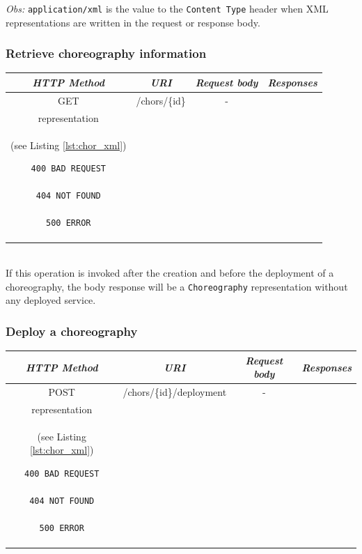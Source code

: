 \emph{Obs:} \texttt{application/xml} is the value to the \texttt{Content Type} header when XML representations are written in the request or response body. 

\subsubsection*{Retrieve choreography information}

\begin{tabular}{|c|c|c|c|}
\hline 
\itshape{HTTP Method} & \itshape{URI} & \itshape{Request body} & \itshape{Responses} \\ 
\hline 
GET & /chors/\{id\} & - &
\begin{minipage}{2in}
\begin{verbatim}

200 OK
location = "/chors/{id}"

Body: 
\end{verbatim}
\verb!Choreography! XML \\
representation \\
(see Listing \ref{lst:chor_xml})
\begin{verbatim}
400 BAD REQUEST

404 NOT FOUND

500 ERROR

\end{verbatim}
\end{minipage} 
\\ 
\hline 
\end{tabular} \\

If this operation is invoked after the creation and before the deployment of a choreography, the body response will be a \verb!Choreography! representation without any deployed service.

\subsubsection*{Deploy a choreography}

\begin{tabular}{|c|c|c|c|}
\hline 
\itshape{HTTP Method} & \itshape{URI} & \itshape{Request body} & \itshape{Responses} \\ 
\hline 
POST & /chors/\{id\}/deployment & - &
\begin{minipage}{2in}
\begin{verbatim}

200 OK
location = "/chors/{id}"
Body: 
\end{verbatim}
\verb!Choreography! XML \\
representation \\
(see Listing \ref{lst:chor_xml})
\begin{verbatim}
400 BAD REQUEST

404 NOT FOUND

500 ERROR

\end{verbatim}
\end{minipage} 
\\ 
\hline 
\end{tabular} \\


